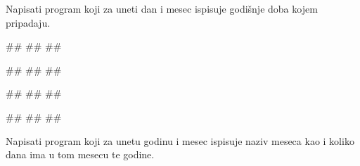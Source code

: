 \begin{Exercise}[label=v1.2_12] 
Napisati program koji za uneti dan i mesec ispisuje godišnje doba kojem pripadaju. 

\begin{miditest}
\begin{upotreba}{1}
#\naslovInt#
##
##
\end{upotreba}
\end{miditest}
\begin{miditest}
\begin{upotreba}{2}
#\naslovInt#
##
##
\end{upotreba}
\end{miditest}

\begin{miditest}
\begin{upotreba}{3}
#\naslovInt#
##
##
\end{upotreba}
\end{miditest}
\begin{miditest}
\begin{upotreba}{4}
#\naslovInt#
##
##
\end{upotreba}
\end{miditest}

\end{Exercise}
\begin{Answer}[ref=v1.2_12]
\end{Answer}





\begin{Exercise}[label=v1.2_17] 
Napisati program koji za unetu godinu i mesec ispisuje naziv meseca kao i koliko dana ima u tom mesecu te godine.

\end{Exercise}
\begin{Answer}[ref=v1.2_17]
\end{Answer}





